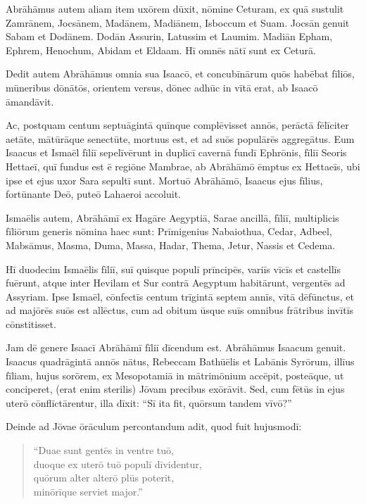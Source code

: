 \Caput
\Versus Abrāhāmus autem aliam item uxōrem dūxit, nōmine Ceturam,
\Versus ex quā sustulit Zamrānem, Jocsānem, Madānem, Madiānem, Isboccum et Suam.
\Versus Jocsān genuit Sabam et Dodānem. Dodān Assurin, Latussim et Laumim.
\Versus Madiān Epham, Ephrem, Henochum, Abidam et Eldaam. Hī omnēs nātī sunt ex Ceturā.

\Versus Dedit autem Abrāhāmus omnia sua Isaacō,
\Versus et concubīnārum quōs habēbat fīliōs, mūneribus dōnātōs, orientem versus, dōnec adhūc in vītā erat, ab Isaacō āmandāvit.

\Versus Ac, postquam centum septuāgintā quīnque complēvisset annōs,
\Versus perāctā fēlīciter aetāte, mātūrāque senectūte, mortuus est, et ad suōs populārēs aggregātus.
\Versus Eum Isaacus et Ismaēl fīliī sepelīvērunt in duplicī cavernā fundī Ephrōnis, fīliī Seoris Hettaeī, quī fundus est ē regiōne Mambrae,
\Versus ab Abrāhāmō ēmptus ex Hettaeīs, ubi ipse et ejus uxor Sara sepultī sunt.
\Versus Mortuō Abrāhāmō, Isaacus ejus fīlius, fortūnante Deō, puteō Lahaeroi accoluit.

\Versus Ismaēlis autem, Abrāhāmī ex Hagāre Aegyptiā, Sarae ancillā, fīliī, multiplicis fīliōrum generis nōmina haec sunt:
\Versus Prīmigenius Nabaiothua, Cedar, Adbeel, Mabsāmus,
\Versus Masma, Duma, Massa,
\Versus Hadar, Thema, Jetur, Nassis et Cedema.

\Versus Hī duodecim Ismaēlis fīliī, suī quisque populī prīncipēs, variīs vīcīs et castellīs fuērunt, atque inter Hevilam et Sur contrā Aegyptum habitārunt, vergentēs ad Assyriam.
\Versus Ipse Ismaēl, cōnfectīs centum trīgintā septem annīs, vītā dēfūnctus, et ad majōrēs suōs est allēctus,
\Versus cum ad obitum ūsque suīs omnibus frātribus invītīs cōnstitisset.

\Versus Jam dē genere Isaacī Abrāhāmī fīliī dīcendum est. Abrāhāmus Isaacum genuit.
\Versus Isaacus quadrāgintā annōs nātus, Rebeccam Bathūēlis et Labānis Syrōrum, illīus fīliam, hujus sorōrem, ex Mesopotamiā in mātrimōnium accēpit,
\Versus posteāque, ut conciperet, (erat enim sterilis) Jōvam precibus exōrāvit.
\Versus Sed, cum fētūs in ejus uterō cōnflīctārentur, illa dīxit: ``Sī ita fit, quōrsum tandem vīvō?''

Deinde ad Jōvae ōrāculum percontandum adit,
\Versus quod fuit hujusmodī:
\begin{verse}
\begin{patverse*}
``Duae sunt gentēs in ventre tuō,\\
 duoque ex uterō tuō populī dīvidentur,\\
 quōrum alter alterō plūs poterit,\\
 minōrīque serviet major.''
\end{patverse*}
\end{verse}

